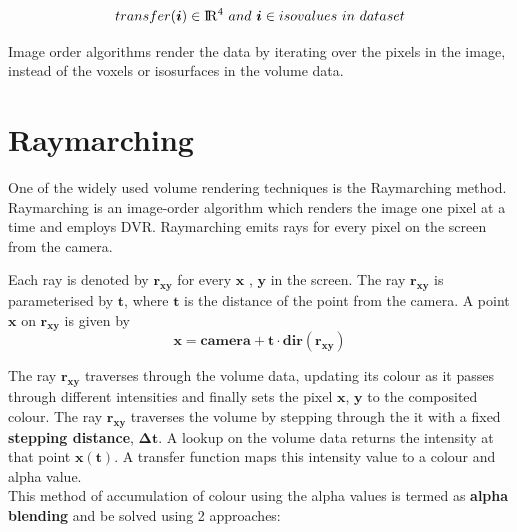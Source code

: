 \documentclass[letterpaper,11pt]{report}
\def\Rfour{{\rm I\!R^4}}
\def\rxy{\bm{r_{xy}}}
\def\dt{\bm{\Delta t}}
\begin{document}
\[ transfer(\bm{i}) \in  \Rfour\ and\  \bm{i} \in isovalues\ in\ dataset  \]

Image order algorithms render the data by iterating over the pixels in the image, instead of the voxels or isosurfaces in the volume data.


\section{Raymarching}
One of the widely used volume rendering techniques is the Raymarching method. Raymarching is an image-order algorithm which renders the image one pixel at a time and employs DVR. Raymarching emits rays for every pixel on the screen from the camera.

Each ray is denoted by $\rxy$ for every $\bm{x}$ , $\bm{y}$ in the screen. The ray $\rxy$ is parameterised by $\bm{t}$, where $\bm{t}$ is the distance of the point from the camera. A point $\bm{x}$ on $\rxy$ is given by
\[ \bm{x} = \bm{camera} + \bm{t} \cdot \bm{dir(\rxy)} \]

The ray $\rxy$ traverses through the volume data, updating its colour as it passes through different intensities and finally sets the pixel $\bm{x}$, $\bm{y}$ to the composited colour. The ray $\rxy$ traverses the volume by stepping through the it with a fixed \textbf{stepping distance}, $\dt$. A lookup on the volume data returns the intensity at that point $\bm{x(t)}$. A transfer function maps this intensity value to a colour and alpha value. \\

This method of accumulation of colour using the alpha values is termed as \textbf{alpha blending} and be solved using 2 approaches:
\end{document}
